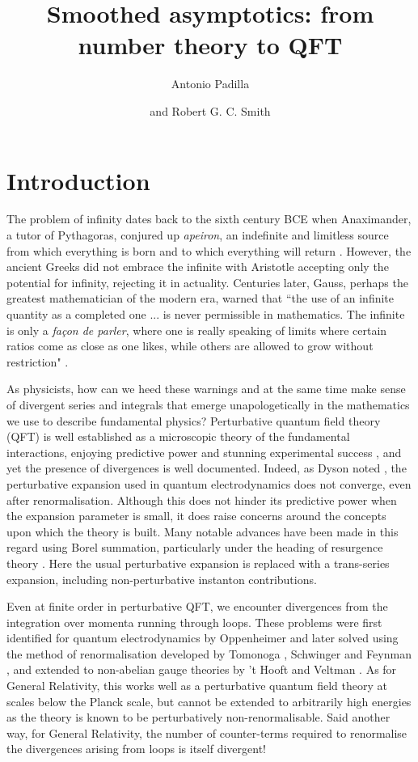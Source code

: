 \documentclass[11pt, letter]{article}
\title{Smoothed asymptotics: from number theory to QFT}
\author{Antonio Padilla}
\author{and Robert G. C. Smith}
\affiliation{School of Physics and Astronomy, University of Nottingham, University Park, Nottingham NG7 2RD, United Kingdom}
\affiliation{The Nottingham Centre of Gravity, University of Nottingham, Nottingham NG7 2RD, UK}
\begin{document}
\maketitle


\section{Introduction}
The problem of infinity dates back to the sixth century BCE when Anaximander, a tutor of Pythagoras,  conjured up {\it apeiron}, an indefinite and limitless source from which everything is born and to which everything will return \cite{moore2018infinite}.  However, the ancient Greeks did not embrace the infinite with Aristotle accepting only the potential for infinity, rejecting it in actuality. Centuries later, Gauss, perhaps the greatest mathematician of the modern era, warned that ``the use of an infinite quantity  as a completed one ... is never permissible in mathematics. The infinite is only a {\it fa\c{c}on de parler}, where one is really speaking of limits where certain ratios come as close as one likes, while others are allowed to grow without restriction" \cite{waterhouse1979gauss}.  


As physicists, how can we heed these warnings and at the same time make sense of divergent series and integrals that emerge unapologetically in the mathematics we use to describe fundamental physics? Perturbative quantum field theory (QFT) is well established as a microscopic theory of the fundamental interactions, enjoying predictive power and stunning experimental success \cite{ParticleDataGroup:2022pth}, and yet the presence of divergences is well documented.  Indeed, as Dyson noted \citep{Dyson52}, the perturbative expansion used in quantum electrodynamics  does not converge, even after renormalisation. Although this does not hinder its predictive power when the expansion parameter is small, it does raise concerns around the concepts upon which the theory is built.  Many notable advances have been made  in this regard using Borel summation, particularly under the heading of resurgence theory \citep{Dorigoni19,Dunne15qft,Marino14}. Here the usual perturbative expansion is replaced with a trans-series expansion, including non-perturbative instanton contributions. 

Even at finite order in perturbative QFT, we encounter divergences from the integration over momenta running through loops. These problems were first identified for quantum electrodynamics by Oppenheimer \cite{Oppenheimer:1930zz} and later solved using the method of renormalisation developed by Tomonoga \cite{Tomonaga:1946zz}, Schwinger \cite{Schwinger:1948iu} and Feynman \cite{Feynman:1948fi}, and extended to non-abelian gauge theories  by 't Hooft and Veltman \cite{tHooft:1972tcz}.  As for General Relativity, this works well as a perturbative quantum field theory at scales below the Planck scale, but cannot be extended to arbitrarily high energies as the theory is known to be perturbatively  non-renormalisable.  Said another way, for General Relativity, the number of counter-terms required to renormalise the divergences arising from loops is itself divergent!
\end{document}
